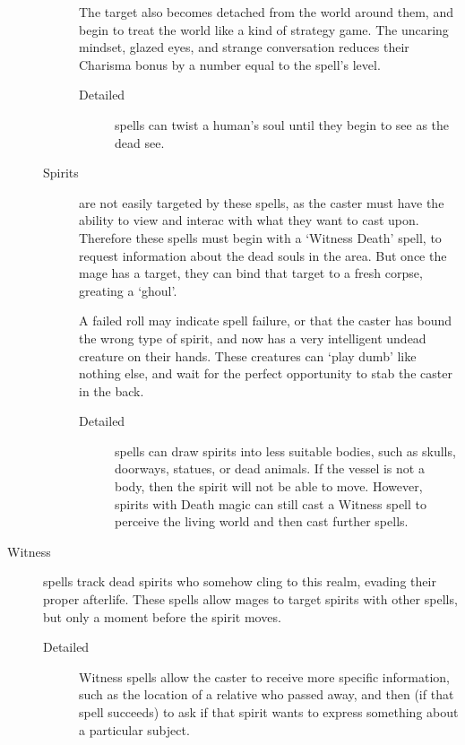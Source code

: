 \begin{multicols}{2}
\begin{description}
\begin{description}
        The target also becomes detached from the world around them, and begin to treat the world like a kind of strategy game.
        The uncaring mindset, glazed eyes, and strange conversation reduces their Charisma bonus by a number equal to the spell's level.
        \begin{description}
          \item[Detailed]
            spells can twist a human's soul until they begin to see as the dead see.%
        \end{description}
      \item[Spirits]
        are not easily targeted by these spells, as the caster must have the ability to view and interac with what they want to cast upon.
        Therefore these spells must begin with a `Witness Death' spell, to request information about the dead souls in the area.
        But once the mage has a target, they can bind that target to a fresh corpse, greating a `ghoul'.

        A failed roll may indicate spell failure, or that the caster has bound the wrong type of spirit, and now has a very intelligent undead creature on their hands.
        These creatures can `play dumb' like nothing else, and wait for the perfect opportunity to stab the caster in the back.
        \begin{description}
          \item[Detailed]
            spells can draw spirits into less suitable bodies, such as skulls, doorways, statues, or dead animals.
            If the vessel is not a body, then the spirit will not be able to move.
            However, spirits with Death magic can still cast a Witness spell to perceive the living world and then cast further spells.
        \end{description}
    \end{description}
  \item[Witness]
    spells track dead spirits who somehow cling to this realm, evading their proper afterlife.%
    These spells allow mages to target spirits with other spells, but only a moment before the spirit moves.
    \begin{description}
      \item[Detailed]
        Witness spells allow the caster to receive more specific information, such as the location of a relative who passed away, and then (if that spell succeeds) to ask if that spirit wants to express something about a particular subject.


\end{description}
\end{description}
\end{multicols}
